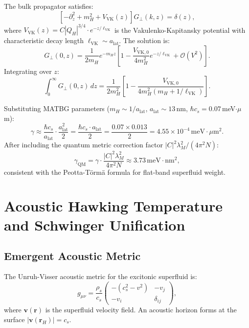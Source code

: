 \documentclass[11pt,letterpaper]{article}
\begin{document}
The bulk propagator satisfies:
\begin{equation}
\left[-\partial_z^2 + m_H^2 + V_{\text{VK}}(z)\right] G_\perp(k, z) = \delta(z),
\end{equation}
where $V_{\text{VK}}(z) = C|Q_H|^{3/4} \cdot e^{-z/\ell_{\text{VK}}}$ is the Vakulenko-Kapitansky potential with characteristic decay length $\ell_{\text{VK}} \sim a_{\text{lat}}$. The solution is:
\begin{equation}
G_\perp(0, z) = \frac{1}{2m_H} e^{-m_H z} \left[1 - \frac{V_{\text{VK},0}}{4m_H^2} e^{-z/\ell_{\text{VK}}} + \mathcal{O}(V^2)\right].
\end{equation}
Integrating over $z$:
\begin{equation}
\int_0^\infty G_\perp(0,z)\, dz = \frac{1}{2m_H^2}\left[1 - \frac{V_{\text{VK},0}}{4m_H^2(m_H + 1/\ell_{\text{VK}})}\right].
\end{equation}

Substituting MATBG parameters ($m_H \sim 1/a_{\text{lat}}$, $a_{\text{lat}} \sim 13$\,nm, $\hbar c_s = 0.07$\,meV$\cdot\mu$m):
\begin{equation}
\gamma \approx \frac{\hbar c_s}{a_{\text{lat}}} \cdot \frac{a_{\text{lat}}^2}{2} = \frac{\hbar c_s \cdot a_{\text{lat}}}{2} = \frac{0.07 \times 0.013}{2} = 4.55 \times 10^{-4}\,\text{meV}\cdot\mu\text{m}^2.
\end{equation}
After including the quantum metric correction factor $|C|^2 \lambda_M^2 / (4\pi^2 N)$:
\begin{equation}
\gamma_{\text{QM}} = \gamma \cdot \frac{|C|^2 \lambda_M^2}{4\pi^2 N} \approx 3.73\,\text{meV}\cdot\text{nm}^2,
\end{equation}
consistent with the Peotta-Törmä formula for flat-band superfluid weight.

\section{Acoustic Hawking Temperature and Schwinger Unification}
\label{sec:hawking}

\subsection{Emergent Acoustic Metric}

The Unruh-Visser acoustic metric for the excitonic superfluid is:
\begin{equation}
g_{\mu\nu} = \frac{\rho_s}{c_s}\begin{pmatrix}
-(c_s^2 - v^2) & -v_j \\
-v_i & \delta_{ij}
\end{pmatrix},
\end{equation}
where $\mathbf{v}(\mathbf{r})$ is the superfluid velocity field. An acoustic horizon forms at the surface $|\mathbf{v}(\mathbf{r}_H)| = c_s$.
\end{document}
